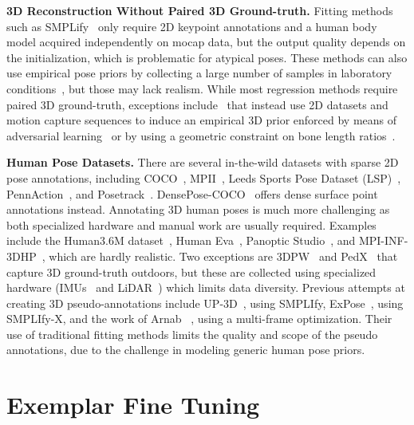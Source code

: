 \documentclass[10pt,twocolumn,letterpaper]{article}
\begin{document}
	\noindent \textbf{3D Reconstruction Without Paired 3D Ground-truth.}
Fitting methods such as SMPLify~\cite{xiao2018simple} only require 2D keypoint annotations and a human body model acquired independently on mocap data, but the output quality depends on the initialization, which is problematic for atypical poses.
	These methods can also use empirical pose priors by collecting a large number of samples in laboratory conditions~\cite{holden2015learning, akhter2015pose,pavlakos19expressive}, but those may lack realism.
While most regression methods require paired 3D ground-truth, exceptions include~\cite{kanazawa2018end,zhou2017towards} that instead use 2D datasets and motion capture sequences to induce an empirical 3D prior enforced by means of adversarial learning~\cite{kanazawa2018end} or by using a geometric constraint on bone length ratios~\cite{zhou2017towards}.


	\noindent \textbf{Human Pose Datasets.}
There are several in-the-wild datasets with sparse 2D pose annotations, including COCO~\cite{lin2014microsoft}, MPII~\cite{Andriluka-14}, Leeds Sports Pose Dataset (LSP)~\cite{Johnson10,Johnson11}, PennAction~\cite{zhang2013actemes}, and Posetrack~\cite{PoseTrack}.
	DensePose-COCO~\cite{guler2018densepose} offers dense surface point annotations instead.
Annotating 3D human poses is much more challenging 
as both specialized hardware and manual work are usually required.
	Examples include the Human3.6M dataset~\cite{h36m_pami}, Human Eva~\cite{sigal2010humaneva}, Panoptic Studio~\cite{joo2017panoptic}, and MPI-INF-3DHP~\cite{singleshotmultiperson2018}, which are hardly realistic.
	Two exceptions are 3DPW~\cite{vonMarcard2018} and PedX~\cite{kim2019pedx} that capture 3D ground-truth outdoors, but these are collected using specialized hardware (IMUs~\cite{vonMarcard2018} and LiDAR~\cite{kim2019pedx}) which limits data diversity.
	Previous attempts at creating 3D pseudo-annotations include UP-3D~\cite{Lassner:UP:2017}, using SMPLIfy, ExPose~\cite{choutas20monocular}, using SMPLIfy-X, and the work of Arnab \etal~\cite{arnab2019exploiting}, using a multi-frame optimization.
	Their use of traditional fitting methods limits the quality and scope of the pseudo annotations, due to the challenge in modeling generic human pose priors.








	
\section{Exemplar Fine Tuning}\label{s:method}
	
\end{document}
